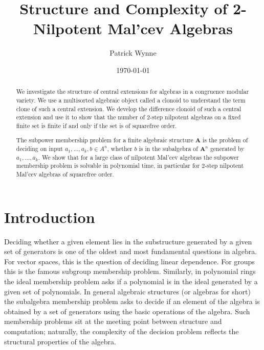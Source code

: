 \documentclass[12pt]{amsart}
\title[2-Nilpotent Mal'cev Algebras]{Structure and Complexity of 2-Nilpotent Mal'cev Algebras}
\date{\today}
\author[P. Wynne]{Patrick Wynne}
\numberwithin{equation}{section}
\theoremstyle{plain}
\theoremstyle{definition}
\newcommand{\A}{\mathbf{A}}
\begin{document}
\begin{abstract}
We investigate the structure of central extensions for algebras in a congruence modular variety.
We use a multisorted algebraic object called a clonoid to understand the term clone 
  of such a central extension. 
We develop the difference clonoid of such a central extension
  and use it to show that 
  the number of $2$-step nilpotent algebras on a fixed finite set is finite
  if and only if the set is of squarefree order.

The subpower membership problem for a finite algebraic structure $\A$ is the problem of deciding 
  on input $a_1,\dots,a_k, b \in A^n$, whether $b$ is in the subalgebra of $\A^n$ generated 
  by $a_1, \dots, a_k$.
We show that for a large class of nilpotent Mal'cev algebras the subpower membership problem 
  is solvable in polynomial time, in particular for $2$-step nilpotent Mal'cev algebras 
  of squarefree order.
\end{abstract} 

\maketitle



\section{Introduction}

Deciding whether a given element lies in the substructure generated by a given set of generators
  is one of the oldest and most fundamental questions in algebra.
For vector spaces, this is the question of deciding linear dependence.
For groups this is the famous subgroup membership problem.
Similarly, in polynomial rings the ideal membership problem asks if a polynomial 
  is in the ideal generated by a given set of polynomials. 
In general algebraic structures (or algebras for short)
  the subalgebra membership problem asks to decide if an element of the algebra 
  is obtained by a set of generators using the basic operations of the algebra.
Such membership problems sit at the meeting point between structure and computation;
  naturally, the complexity of the decision problem reflects the structural properties of the algebra.
\end{document}
